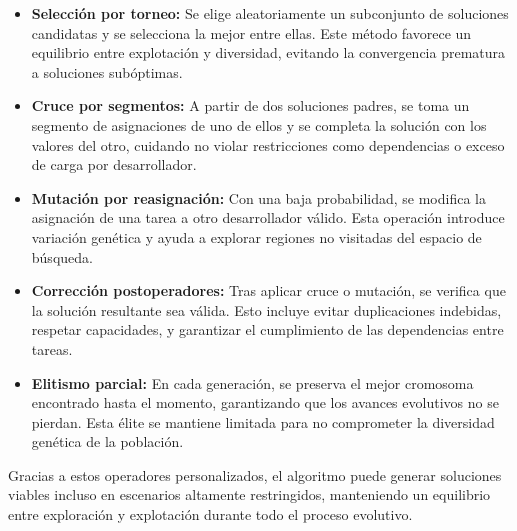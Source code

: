 \begin{itemize}
\item \textbf{Selección por torneo:} Se elige aleatoriamente un subconjunto de soluciones candidatas y se selecciona la mejor entre ellas. Este método favorece un equilibrio entre explotación y diversidad, evitando la convergencia prematura a soluciones subóptimas.

\item \textbf{Cruce por segmentos:} A partir de dos soluciones padres, se toma un segmento de asignaciones de uno de ellos y se completa la solución con los valores del otro, cuidando no violar restricciones como dependencias o exceso de carga por desarrollador.

\item \textbf{Mutación por reasignación:} Con una baja probabilidad, se modifica la asignación de una tarea a otro desarrollador válido. Esta operación introduce variación genética y ayuda a explorar regiones no visitadas del espacio de búsqueda.

\item \textbf{Corrección postoperadores:} Tras aplicar cruce o mutación, se verifica que la solución resultante sea válida. Esto incluye evitar duplicaciones indebidas, respetar capacidades, y garantizar el cumplimiento de las dependencias entre tareas.

\item \textbf{Elitismo parcial:} En cada generación, se preserva el mejor cromosoma encontrado hasta el momento, garantizando que los avances evolutivos no se pierdan. Esta élite se mantiene limitada para no comprometer la diversidad genética de la población.
\end{itemize}

Gracias a estos operadores personalizados, el algoritmo puede generar soluciones viables incluso en escenarios altamente restringidos, manteniendo un equilibrio entre exploración y explotación durante todo el proceso evolutivo.




